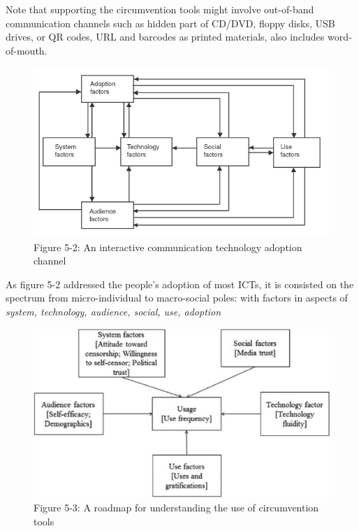 \documentclass[nonacm,sigplan,screen]{acmart}
\begin{document}
Note that supporting the circumvention tools might involve out-of-band
communication channels such as hidden part of CD/DVD, floppy disks, USB
drives, or QR codes, URL and barcodes as printed materials, also
includes word-of-mouth.

\begin{figure}
\centering
\includegraphics[width=\columnwidth]{./res/5.2-adoption.png}
\caption{Figure 5-2: An interactive communication technology adoption
channel}
\end{figure}

As figure 5-2 \cite{49_ICTAdopt} addressed the people's adoption of most
ICTs, it is consisted on the spectrum from micro-individual to
macro-social poles: with factors in aspects of \emph{system, technology,
audience, social, use, adoption}

\begin{figure}
\centering
\includegraphics[width=\columnwidth]{./res/5.3-circumventAdopt.png}
\caption{Figure 5-3: A roadmap for understanding the use of
circumvention tools}
\end{figure}
\end{document}
